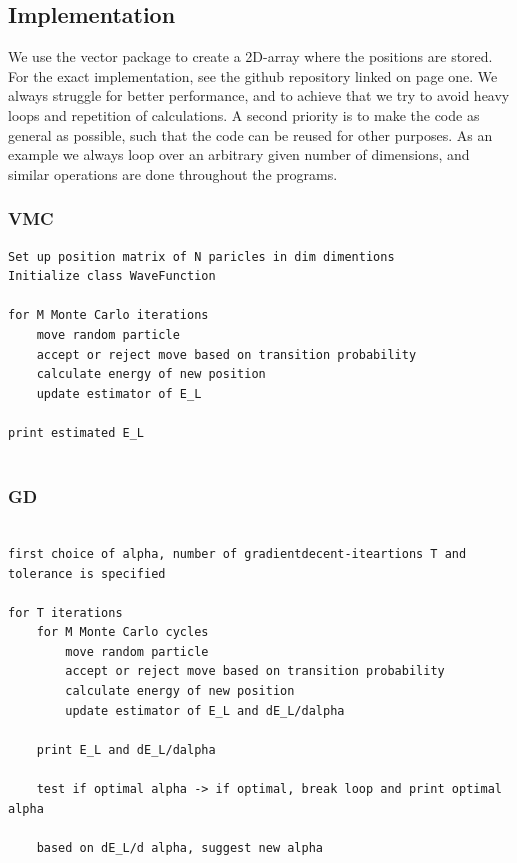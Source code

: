 \documentclass[norsk,a4paper,12pt]{article}
\begin{document}
\subsection{Implementation}
We use the vector package to create a 2D-array where the positions are stored. For the exact implementation, see the github repository linked on page one. We always struggle for better performance, and to achieve that we try to avoid heavy loops and repetition of calculations. A second priority is to make the code as general as possible, such that the code can be reused for other purposes. As an example we always loop over an arbitrary given number of dimensions, and similar operations are done throughout the programs. 

\subsubsection{VMC}

\lstset{basicstyle=\scriptsize}
\begin{lstlisting}
Set up position matrix of N paricles in dim dimentions
Initialize class WaveFunction
	
for M Monte Carlo iterations
	move random particle
	accept or reject move based on transition probability
	calculate energy of new position
	update estimator of E_L

print estimated E_L 
	
\end{lstlisting}

\subsubsection{GD}

\lstset{basicstyle=\scriptsize}
\begin{lstlisting}

first choice of alpha, number of gradientdecent-iteartions T and tolerance is specified

for T iterations 
	for M Monte Carlo cycles
		move random particle
		accept or reject move based on transition probability
		calculate energy of new position
		update estimator of E_L and dE_L/dalpha 
		
	print E_L and dE_L/dalpha
	
	test if optimal alpha -> if optimal, break loop and print optimal alpha
	
	based on dE_L/d alpha, suggest new alpha	

\end{lstlisting}
\end{document}
